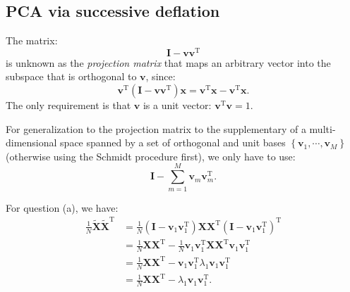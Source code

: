 \documentclass[UTF8]{ctexart}
\begin{document}
\subsection{PCA via successive deflation}
The matrix:
$$\textbf{I}-\textbf{v}\textbf{v}^{\text{T}}$$
is unknown as the \emph{projection matrix} that maps an arbitrary vector into the subspace that is orthogonal to $\textbf{v}$, since:
$$\textbf{v}^{\text{T}}(\textbf{I}-\textbf{v}\textbf{v}^{\text{T}})\textbf{x}=\textbf{v}^{\text{T}}\textbf{x}-\textbf{v}^{\text{T}}\textbf{x}.$$
The only requirement is that $\textbf{v}$ is a unit vector: $\textbf{v}^{\text{T}}\textbf{v}=1$.

For generalization to the projection matrix to the supplementary of a multi-dimensional space spanned by a set of orthogonal and unit bases $\left\{\textbf{v}_{1},\cdots,\textbf{v}_{M}\right\}$ (otherwise using the Schmidt procedure first), we only have to use:
$$\textbf{I}-\sum_{m=1}^{M}\textbf{v}_{m}\textbf{v}_{m}^{\text{T}}.$$

For question (a), we have:
$$
\begin{aligned}
\frac{1}{N}\tilde{\textbf{X}}\tilde{\textbf{X}}^{\text{T}}&=\frac{1}{N}\left(\textbf{I}-\textbf{v}_{1}\textbf{v}_{1}^{\text{T}}\right)\textbf{X}\textbf{X}^{\text{T}}\left(\textbf{I}-\textbf{v}_{1}\textbf{v}_{1}^{\text{T}}\right)^{\text{T}}\\
&=\frac{1}{N}\textbf{X}\textbf{X}^{\text{T}}-\frac{1}{N}\textbf{v}_{1}\textbf{v}_{1}^{\text{T}}\textbf{X}\textbf{X}^{\text{T}}\textbf{v}_{1}\textbf{v}_{1}^{\text{T}}\\
&=\frac{1}{N}\textbf{X}\textbf{X}^{\text{T}}-\textbf{v}_{1}\textbf{v}_{1}^{\text{T}}\lambda_{1}\textbf{v}_{1}\textbf{v}_{1}^{\text{T}}\\
&=\frac{1}{N}\textbf{X}\textbf{X}^{\text{T}}-\lambda_{1}\textbf{v}_{1}\textbf{v}_{1}^{\text{T}}.
\end{aligned}
$$
\end{document}
